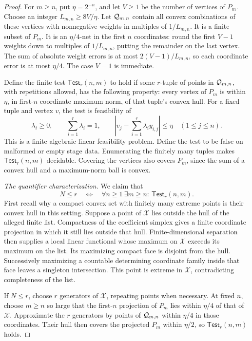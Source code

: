 \begin{proof}
For \(m\ge n\), put \(\eta=2^{-n}\), and let \(V\ge1\) be the
number of vertices of \(P_m\).  Choose an integer
\(L_{m,n}\ge8V/\eta\).  Let \(\mathcal Q_{m,n}\) contain all convex
combinations of these vertices with nonnegative weights in
multiples of \(1/L_{m,n}\).  It is a finite subset of \(P_m\).
It is an \(\eta/4\)-net in the first \(n\) coordinates: round
the first \(V-1\) weights down to multiples of \(1/L_{m,n}\), putting
the remainder on the last vertex.  The sum of absolute weight
errors is at most \(2(V-1)/L_{m,n}\), so each coordinate error is at most
\(\eta/4\).  The case \(V=1\) is immediate.

Define the finite test \(\mathsf{Test}_r(n,m)\) to hold if some \(r\)-tuple
of points in \(\mathcal Q_{m,n}\), with repetitions allowed, has the
following property: every vertex of \(P_m\) is within \(\eta\),
in first-\(n\) coordinate maximum norm, of that tuple's convex
hull.  For a fixed tuple and vertex \(v\), the test is feasibility
of
\[
 \lambda_i\ge0,\qquad \sum_{i=1}^r\lambda_i=1,\qquad
 \left|v_j-\sum_{i=1}^r\lambda_i y_{i,j}\right|\le\eta
 \quad(1\le j\le n).
\]
This is a finite algebraic linear-feasibility problem.  Define the test to be false on malformed or empty stage data.
Enumerating the finitely many tuples makes \(\mathsf{Test}_r(n,m)\) decidable.  Covering
the vertices also covers \(P_m\), since the sum of a convex hull
and a maximum-norm ball is convex.

\emph{The quantifier characterization.}
We claim that
\begin{equation}\label{eq:finite-count-formula}
 N\le r
 \quad\Longleftrightarrow\quad
 \forall n\ge1\ \exists m\ge n:\ \mathsf{Test}_r(n,m).
\end{equation}
First recall why a compact convex set with finitely many extreme
points is their convex hull in this setting.  Suppose a point of
\(\mathcal X\) lies outside the hull of the alleged finite list.  Compactness
of the coefficient simplex gives a finite coordinate projection
in which it still lies outside that hull.  Finite-dimensional
separation then supplies a local linear functional whose maximum
on \(\mathcal X\) exceeds its maximum on the list.  Its maximizing compact
face is disjoint from the hull.  Successively maximizing a
countable determining coordinate family inside that face leaves a
singleton intersection.  This point is extreme in \(\mathcal X\),
contradicting completeness of the list.

If \(N\le r\), choose \(r\) generators of \(\mathcal X\), repeating
points when necessary.  At fixed \(n\), choose \(m\ge n\) so
large that the first-\(n\) projection of \(P_m\) lies within
\(\eta/4\) of that of \(\mathcal X\).  Approximate the \(r\) generators
by points of \(\mathcal Q_{m,n}\) within \(\eta/4\) in those
coordinates.  Their hull then covers the projected \(P_m\) within
\(\eta/2\), so \(\mathsf{Test}_r(n,m)\) holds.


\end{proof}
